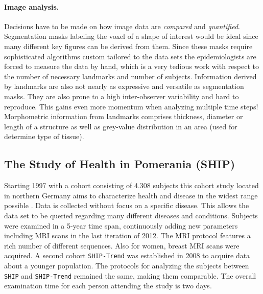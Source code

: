 \documentclass[journal]{style/vgtc} 			          %
\begin{document}
\paragraph{Image analysis.} \label{ImageAnalysis} Decisions have to be made on how image data are \emph{compared} and \emph{quantified}.
%
Segmentation masks labeling the voxel of a shape of interest would be ideal since many different key figures can be derived from them.
%
Since these masks require sophisticated algorithms custom tailored to the data sets the epidemiologists are forced to measure the data by hand, which is a very tedious work with respect to the number of necessary landmarks and number of subjects.
%
Information derived by landmarks are also not nearly as expressive and versatile as segmentation masks.
%
They are also prone to a high inter-observer variability and hard to reproduce.
%
This gains even more momentum when analyzing multiple time steps!
%
Morphometric information from landmarks comprises thickness, diameter or length of a structure as well as grey-value distribution in an area (used for determine type of tissue).



\subsection{The Study of Health in Pomerania (SHIP)}
Starting 1997 with a cohort consisting of 4.308 subjects this cohort study located in northern Germany aims to characterize health and disease in the widest range possible \cite{Volzke2011}.
%
Data is collected without focus on a specific disease.
%
This allows the data set to be queried regarding many different diseases and conditions.
%
Subjects were examined in a 5-year time span, continuously adding new parameters including MRI scans in the last iteration of 2012.
%
The MRI protocol features a rich number of different sequences.
%
Also for women, breast MRI scans were acquired.
%
A second cohort \texttt{SHIP-Trend} was established in 2008 to acquire data about a younger population.
%
The protocols for analyzing the subjects between \texttt{SHIP} and \texttt{SHIP-Trend} remained the same, making them comparable.
%
The overall examination time for each person attending the study is two days.
\end{document}
